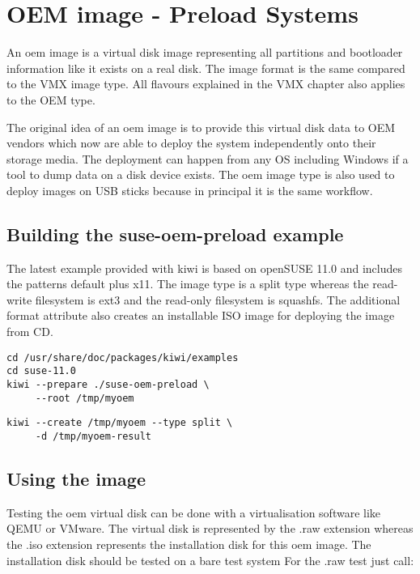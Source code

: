 \chapter{OEM image - Preload Systems}
\label{chapter:oem}
\minitoc

An oem image is a virtual disk image representing all partitions
and bootloader information like it exists on a real disk. The image
format is the same compared to the VMX image type. All flavours
explained in the VMX chapter also applies to the OEM type.

The original idea of an oem image is to provide this virtual disk data
to OEM vendors which now are able to deploy the system independently onto
their storage media. The deployment can happen from any OS including
Windows if a tool to dump data on a disk device exists. The oem image
type is also used to deploy images on USB sticks because in principal
it is the same workflow.

\section{Building the suse-oem-preload example}

The latest example provided with kiwi is based on openSUSE 11.0 and includes
the patterns default plus x11. The image type is a split type whereas
the read-write filesystem is ext3 and the read-only filesystem is
squashfs. The additional format attribute also creates an installable
ISO image for deploying the image from CD. 

\begin{Command}{12cm}
\begin{verbatim}
cd /usr/share/doc/packages/kiwi/examples
cd suse-11.0
kiwi --prepare ./suse-oem-preload \
     --root /tmp/myoem
\end{verbatim}
\end{Command}

\begin{Command}{12cm}
\begin{verbatim}
kiwi --create /tmp/myoem --type split \
     -d /tmp/myoem-result
\end{verbatim}
\end{Command}

\section{Using the image}

Testing the oem virtual disk can be done with a virtualisation software
like QEMU or VMware. The virtual disk is represented by the .raw extension
whereas the .iso extension represents the installation disk for this oem
image. The installation disk should be tested on a bare test system
For the .raw test just call:

